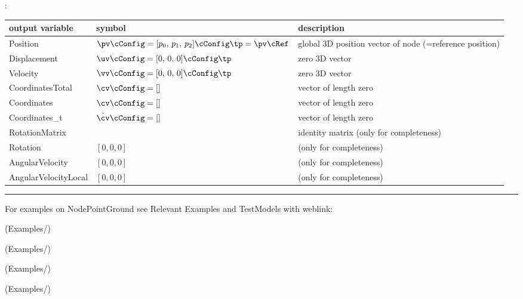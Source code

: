 :
\begin{center}
\footnotesize
\begin{longtable}{| p{5cm} | p{5cm} | p{6cm} |} 
\hline
\bf output variable & \bf symbol & \bf description \\ \hline
Position & $\pv\cConfig = [p_0,\,p_1,\,p_2]\cConfig\tp = \pv\cRef$ & global 3D position vector of node (=reference position)\\ \hline
Displacement & $\uv\cConfig = [0,\,0,\,0]\cConfig\tp$ & zero 3D vector\\ \hline
Velocity & $\vv\cConfig = [0,\,0,\,0]\cConfig\tp$ & zero 3D vector\\ \hline
CoordinatesTotal & $\cv\cConfig =[]$ & vector of length zero\\ \hline
Coordinates & $\cv\cConfig =[]$ & vector of length zero\\ \hline
Coordinates\_t & $\dot\cv\cConfig =[]$ & vector of length zero\\ \hline
RotationMatrix &  & identity matrix (only for completeness)\\ \hline
Rotation & $[0,0,0]$ &  (only for completeness)\\ \hline
AngularVelocity & $[0,0,0]$ &  (only for completeness)\\ \hline
AngularVelocityLocal & $[0,0,0]$ &  (only for completeness)\\ \hline
\end{longtable}
\end{center}
\vspace{6pt}\par\noindent\rule{\textwidth}{0.4pt}
%
\noindent For examples on NodePointGround see Relevant Examples and TestModels with weblink:
\bi
\item {} (Examples/)
\item {} (Examples/)
\item {} (Examples/)
\item {} (Examples/)
